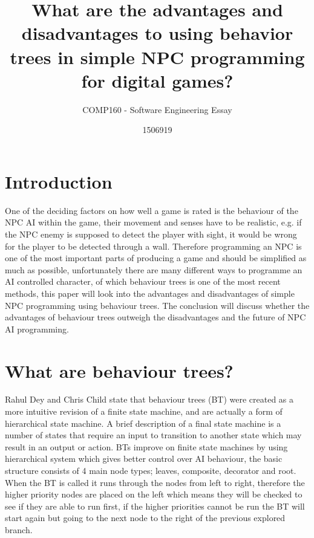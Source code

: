\documentclass{scrartcl}
\title{What are the advantages and disadvantages to using behavior trees in simple NPC programming for digital games?}
\subtitle{COMP160 - Software Engineering Essay}
\author{1506919}
\begin{document}
\maketitle


\section{Introduction}

One of the deciding factors on how well a game is rated is the behaviour of the NPC AI within the game, their movement and senses have to be realistic\cite{dey2013ql}, e.g. if the NPC enemy is supposed to detect the player with sight, it would be wrong for the player to be detected through a wall. Therefore programming an NPC is one of the most important parts of producing a game\cite{buckland2005programming} and should be simplified as much as possible, unfortunately there are many different ways to programme an AI controlled character, of which behaviour trees is one of the most recent methods\cite{GDCVault}, this paper will look into the advantages and disadvantages of simple NPC programming using behaviour trees. The conclusion will discuss whether the advantages of behaviour trees outweigh the disadvantages and the future of NPC AI programming.

\section{What are behaviour trees?}

Rahul Dey and Chris Child state that behaviour trees (BT) were created as a more intuitive revision of a finite state machine\cite{dey2013ql}, and are actually a form of hierarchical state machine. A brief description of a final state machine is a number of states that require an input to transition to another state which may result in an output or action\cite{buckland2005programming}. BTs improve on finite state machines by using hierarchical system which gives better control over AI behaviour, the basic structure consists of 4 main node types\cite{gamasutra}; leaves, composite, decorator and root. When the BT is called it runs through the nodes from left to right, therefore the higher priority nodes are placed on the left which means they will be checked to see if they are able to run first, if the higher priorities cannot be run the BT will start again but going to the next node to the right of the previous explored branch\cite{youtube}.
\end{document}
